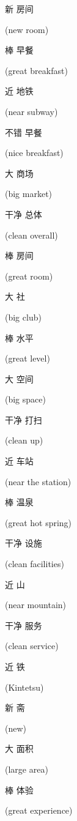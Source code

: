 \begin{CJK}{UTF8}{gbsn}新 房间\end{CJK} (new room)
\begin{CJK}{UTF8}{gbsn}棒 早餐\end{CJK} (great breakfast)
\begin{CJK}{UTF8}{gbsn}近 地铁\end{CJK} (near subway)
\begin{CJK}{UTF8}{gbsn}不错 早餐\end{CJK} (nice breakfast)
\begin{CJK}{UTF8}{gbsn}大 商场\end{CJK} (big market)
\begin{CJK}{UTF8}{gbsn}干净 总体\end{CJK} (clean overall)
\begin{CJK}{UTF8}{gbsn}棒 房间\end{CJK} (great room)
\begin{CJK}{UTF8}{gbsn}大 社\end{CJK} (big club)
\begin{CJK}{UTF8}{gbsn}棒 水平\end{CJK} (great level)
\begin{CJK}{UTF8}{gbsn}大 空间\end{CJK} (big space)
\begin{CJK}{UTF8}{gbsn}干净 打扫\end{CJK} (clean up)
\begin{CJK}{UTF8}{gbsn}近 车站\end{CJK} (near the station)
\begin{CJK}{UTF8}{gbsn}棒 温泉\end{CJK} (great hot spring)
\begin{CJK}{UTF8}{gbsn}干净 设施\end{CJK} (clean facilities)
\begin{CJK}{UTF8}{gbsn}近 山\end{CJK} (near mountain)
\begin{CJK}{UTF8}{gbsn}干净 服务\end{CJK} (clean service)
\begin{CJK}{UTF8}{gbsn}近 铁\end{CJK} (Kintetsu)
\begin{CJK}{UTF8}{gbsn}新 斋\end{CJK} (new)
\begin{CJK}{UTF8}{gbsn}大 面积\end{CJK} (large area)
\begin{CJK}{UTF8}{gbsn}棒 体验\end{CJK} (great experience)
